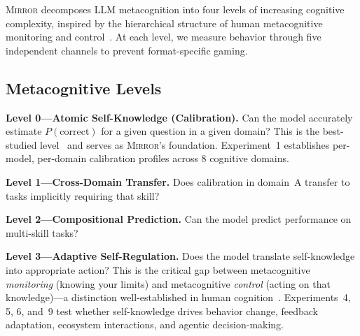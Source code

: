 \documentclass[10pt]{article}
\newcommand{\mirror}{\textsc{Mirror}}
\begin{document}
\mirror{} decomposes LLM metacognition into four levels of increasing cognitive
complexity, inspired by the hierarchical structure of human metacognitive monitoring
and control~\citep{flavell1979metacognition, nelson1990metamemory}. At each level,
we measure behavior through five independent channels to prevent format-specific
gaming.

\subsection{Metacognitive Levels}

\textbf{Level 0---Atomic Self-Knowledge (Calibration).}
Can the model accurately estimate $P(\text{correct})$ for a given question in a
given domain? This is the best-studied level~\citep{kadavath2022language,
kapoor2024calibration} and serves as \mirror{}'s foundation. Experiment~1
establishes per-model, per-domain calibration profiles across 8 cognitive domains.

\textbf{Level 1---Cross-Domain Transfer.}
Does calibration in domain~A transfer to tasks implicitly requiring that skill?

\textbf{Level 2---Compositional Prediction.}
Can the model predict performance on multi-skill tasks?

\textbf{Level 3---Adaptive Self-Regulation.}
Does the model translate self-knowledge into appropriate action? This is the
critical gap between metacognitive \textit{monitoring} (knowing your limits) and
metacognitive \textit{control} (acting on that knowledge)---a distinction
well-established in human cognition~\citep{metcalfe2008metacognitive}.
Experiments~4, 5, 6, and~9 test whether self-knowledge drives behavior change,
feedback adaptation, ecosystem interactions, and agentic decision-making.
\end{document}
